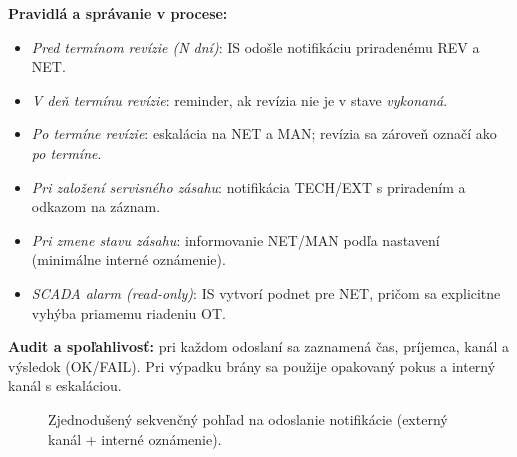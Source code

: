 \textbf{Pravidlá a správanie v procese:}
\begin{itemize}
\item \emph{Pred termínom revízie (N dní)}: IS odošle notifikáciu priradenému REV a NET.
\item \emph{V deň termínu revízie}: reminder, ak revízia nie je v stave \emph{vykonaná}.
\item \emph{Po termíne revízie}: eskalácia na NET a MAN; revízia sa zároveň označí ako \emph{po termíne}.
\item \emph{Pri založení servisného zásahu}: notifikácia TECH/EXT s priradením a odkazom na záznam.
\item \emph{Pri zmene stavu zásahu}: informovanie NET/MAN podľa nastavení (minimálne interné oznámenie).
\item \emph{SCADA alarm (read-only)}: IS vytvorí podnet pre NET, pričom sa explicitne vyhýba priamemu riadeniu OT.
\end{itemize}

\textbf{Audit a spoľahlivosť:} pri každom odoslaní sa zaznamená čas, príjemca, kanál a výsledok (OK/FAIL). Pri výpadku brány sa použije opakovaný pokus a interný kanál s eskaláciou.

\begin{figure}[!htbp]
\centering
\footnotesize
{}
\caption{Zjednodušený sekvenčný pohľad na odoslanie notifikácie (externý kanál + interné oznámenie).}
\label{fig:process-notify-seq}
\end{figure}

